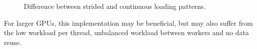 \begin{figure}[ht]
	\centering
	\def\svgwidth{0.6\textwidth}
	
	\caption{Difference between strided and continuous loading patterns.}
	\label{fig:block_per_shift_local_results}
\end{figure}

For larger GPUs, this implementation may be beneficial, but may also suffer from the low workload per thread, unbalanced workload between workers and no data reuse.



